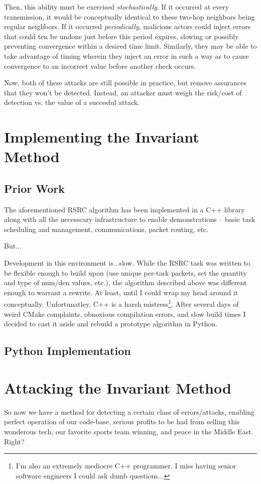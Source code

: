 \documentclass[11pt]{article}
\begin{document}
Then, this ability must be exercised \textit{stochastically}. If it occurred at
every transmission, it would be conceptually identical to these two-hop
neighbors being regular neighbors. If it occurred \textit{periodically}, malicious
actors could inject errors that could ten be undone just before this period expires,
slowing or possibly preventing convergence within a desired time limit. Similarly, they may
be able to take advantage of timing wherein they inject an error in such a way as to
cause convergence to an incorrect value before another check occurs.

Now, both of these attacks are still possible in practice, but remove assurances
that they won't be detected. Instead, an attacker must weigh the risk/cost of
detection vs. the value of a succesful attack.



\section{Implementing the Invariant Method}
\subsection*{Prior Work}
The aforementioned RSRC algorithm has been implemented in a C++ library along with all the necesscary
infrastructure to enable demonstrations -- basic task scheduling and management,
communications, packet routing, etc.

\medskip
\noindent
But...

\medskip
\noindent
\noindent
Development in this environment is...slow. While the RSRC task was written to be flexible enough to
build upon (use unique per-task packets, set the quantity and type of num/den
values, etc.), the algorithm described above was different enough to warrant a
rewrite. At least, until I could wrap my head around it conceptually.
Unfortunatley, C++ is a harsh mistress\footnote{I'm also an extremely mediocre
    C++ programmer. I miss having senior software engineers I could ask dumb
    questions...}. After several days of weird CMake complaints, obnoxious
compilation errors, and slow build times I decided to cast it aside and rebuild
a prototype algorithm in Python.

\subsection*{Python Implementation}


\section{Attacking the Invariant Method}
So now we have a method for detecting a certain class of errors/attacks,
enabling perfect operation of our code-base, serious profits to be had from
selling this wonderous tech, our favorite sports team winning, and peace in the
Middle East. Right?
\end{document}
